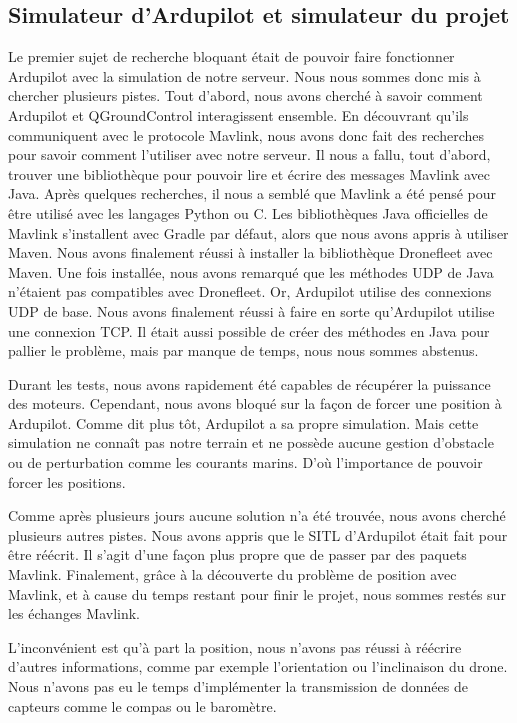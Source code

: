\documentclass{scrartcl}
\begin{document}
\subsection{Simulateur d'Ardupilot et simulateur du projet}
Le premier sujet de recherche bloquant était de pouvoir faire fonctionner Ardupilot avec la simulation de notre serveur.
Nous nous sommes donc mis à chercher plusieurs pistes.
Tout d'abord, nous avons cherché à savoir comment Ardupilot et QGroundControl interagissent ensemble.
En découvrant qu'ils communiquent avec le protocole Mavlink, nous avons donc fait des recherches pour savoir comment l'utiliser avec notre serveur.
Il nous a fallu, tout d'abord, trouver une bibliothèque pour pouvoir lire et écrire des messages Mavlink avec Java.
Après quelques recherches, il nous a semblé que Mavlink a été pensé pour être utilisé avec les langages Python ou C.
Les bibliothèques Java officielles de Mavlink s’installent avec Gradle par défaut, alors que nous avons appris à utiliser Maven.
Nous avons finalement réussi à installer la bibliothèque Dronefleet avec Maven.
Une fois installée, nous avons remarqué que les méthodes UDP de Java n'étaient pas compatibles avec Dronefleet.
Or, Ardupilot utilise des connexions UDP de base.
Nous avons finalement réussi à faire en sorte qu'Ardupilot utilise une connexion TCP.
Il était aussi possible de créer des méthodes en Java pour pallier le problème, mais par manque de temps, nous nous sommes abstenus.

Durant les tests, nous avons rapidement été capables de récupérer la puissance des moteurs.
Cependant, nous avons bloqué sur la façon de forcer une position à Ardupilot.
Comme dit plus tôt, Ardupilot a sa propre simulation.
Mais cette simulation ne connaît pas notre terrain et ne possède aucune gestion d'obstacle ou de perturbation comme les courants marins.
D'où l'importance de pouvoir forcer les positions.

Comme après plusieurs jours aucune solution n'a été trouvée, nous avons cherché plusieurs autres pistes.
Nous avons appris que le SITL d’Ardupilot était fait pour être réécrit.
Il s'agit d'une façon plus propre que de passer par des paquets Mavlink.
Finalement, grâce à la découverte du problème de position avec Mavlink, et à cause du temps restant pour finir le projet, nous sommes restés sur les échanges Mavlink.

L’inconvénient est qu’à part la position, nous n’avons pas réussi à réécrire d’autres informations,
comme par exemple l’orientation ou l’inclinaison du drone.
Nous n’avons pas eu le temps d’implémenter la transmission de données de capteurs comme le compas ou le baromètre.
\end{document}
